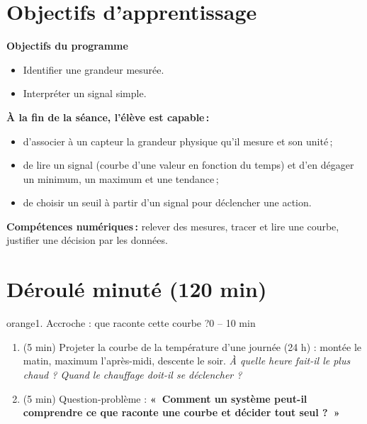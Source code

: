 \documentclass[11pt,a4paper]{article}
\begin{document}
\section{Objectifs d'apprentissage}
\begin{tcolorbox}[colback=gray!8,colframe=gray!60!black,arc=1mm,boxrule=0.5pt]
\textbf{Objectifs du programme}
\begin{itemize}
 \item Identifier une grandeur mesurée.
 \item Interpréter un signal simple.
\end{itemize}
\textbf{À la fin de la séance, l'élève est capable\,:}
\begin{itemize}
 \item d'associer à un capteur la grandeur physique qu'il mesure et son unité\,;
 \item de lire un signal (courbe d'une valeur en fonction du temps) et d'en dégager un minimum, un maximum et une tendance\,;
 \item de choisir un seuil à partir d'un signal pour déclencher une action.
\end{itemize}
\textbf{Compétences numériques\,:} relever des mesures, tracer et lire une courbe, justifier une décision par les données.
\end{tcolorbox}

\section{Déroulé minuté (120 min)}

\begin{etape}{orange}{1. Accroche : que raconte cette courbe ?}{0 -- 10 min}
\begin{enumerate}
 \item (5 min) Projeter la courbe de la température d'une journée (24 h) : montée le matin, maximum l'après-midi, descente le soir. \emph{À quelle heure fait-il le plus chaud ? Quand le chauffage doit-il se déclencher ?}
 \item (5 min) Question-problème : \textbf{«~Comment un système peut-il comprendre ce que raconte une courbe et décider tout seul ?~»}
\end{enumerate}
\end{etape}
\end{document}
